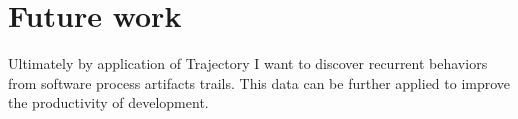 \documentclass[a4paper,10pt]{article}
\numberwithin{equation}{subsection}
\begin{document}
\section{Future work}
Ultimately by application of Trajectory I want to discover recurrent behaviors from
software process artifacts trails. This data can be further applied to improve the
productivity of development.


\clearpage


\clearpage




\end{document}
